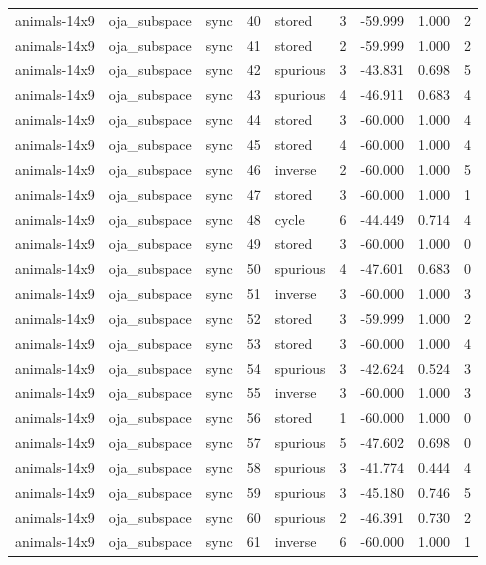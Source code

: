 \begin{tabular}{lllrlrrrr}
animals-14x9 & oja\_subspace & sync & 40 & stored & 3 & -59.999 & 1.000 & 2 \\
animals-14x9 & oja\_subspace & sync & 41 & stored & 2 & -59.999 & 1.000 & 2 \\
animals-14x9 & oja\_subspace & sync & 42 & spurious & 3 & -43.831 & 0.698 & 5 \\
animals-14x9 & oja\_subspace & sync & 43 & spurious & 4 & -46.911 & 0.683 & 4 \\
animals-14x9 & oja\_subspace & sync & 44 & stored & 3 & -60.000 & 1.000 & 4 \\
animals-14x9 & oja\_subspace & sync & 45 & stored & 4 & -60.000 & 1.000 & 4 \\
animals-14x9 & oja\_subspace & sync & 46 & inverse & 2 & -60.000 & 1.000 & 5 \\
animals-14x9 & oja\_subspace & sync & 47 & stored & 3 & -60.000 & 1.000 & 1 \\
animals-14x9 & oja\_subspace & sync & 48 & cycle & 6 & -44.449 & 0.714 & 4 \\
animals-14x9 & oja\_subspace & sync & 49 & stored & 3 & -60.000 & 1.000 & 0 \\
animals-14x9 & oja\_subspace & sync & 50 & spurious & 4 & -47.601 & 0.683 & 0 \\
animals-14x9 & oja\_subspace & sync & 51 & inverse & 3 & -60.000 & 1.000 & 3 \\
animals-14x9 & oja\_subspace & sync & 52 & stored & 3 & -59.999 & 1.000 & 2 \\
animals-14x9 & oja\_subspace & sync & 53 & stored & 3 & -60.000 & 1.000 & 4 \\
animals-14x9 & oja\_subspace & sync & 54 & spurious & 3 & -42.624 & 0.524 & 3 \\
animals-14x9 & oja\_subspace & sync & 55 & inverse & 3 & -60.000 & 1.000 & 3 \\
animals-14x9 & oja\_subspace & sync & 56 & stored & 1 & -60.000 & 1.000 & 0 \\
animals-14x9 & oja\_subspace & sync & 57 & spurious & 5 & -47.602 & 0.698 & 0 \\
animals-14x9 & oja\_subspace & sync & 58 & spurious & 3 & -41.774 & 0.444 & 4 \\
animals-14x9 & oja\_subspace & sync & 59 & spurious & 3 & -45.180 & 0.746 & 5 \\
animals-14x9 & oja\_subspace & sync & 60 & spurious & 2 & -46.391 & 0.730 & 2 \\
animals-14x9 & oja\_subspace & sync & 61 & inverse & 6 & -60.000 & 1.000 & 1 \\

\end{tabular}
